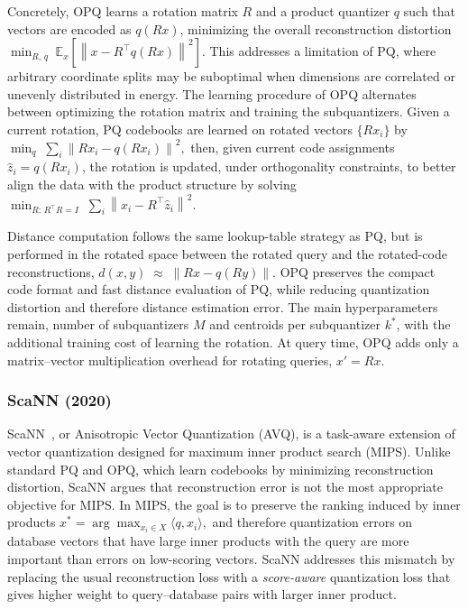 \documentclass[sigconf]{acmart}
\begin{document}
Concretely, OPQ learns a rotation matrix $R$ and a product quantizer $q$ such that vectors are encoded as $q(Rx)$, minimizing the overall reconstruction distortion
\(
\min_{R,\,q} \; \mathbb{E}_{x}\!\left[\left\| x - R^\top q(Rx) \right\|^2\right].
\)
This addresses a limitation of PQ, where arbitrary coordinate splits may be suboptimal when dimensions are correlated or unevenly distributed in energy.
The learning procedure of OPQ alternates between optimizing the rotation matrix and training the subquantizers.
Given a current rotation, PQ codebooks are learned on rotated vectors $\{Rx_i\}$ by 
\(
\min_{q} \; \sum_i \left\| Rx_i - q(Rx_i) \right\|^2 ,
\)
then, given current code assignments $\hat{z}_i = q(Rx_i)$, the rotation is updated, under orthogonality constraints, to better align the data with the product structure by solving
\(
\min_{R:\, R^\top R = I} \; \sum_i \left\| x_i - R^\top \hat{z}_i \right\|^2 .
\)

Distance computation follows the same lookup-table strategy as PQ, but is performed in the rotated space between the rotated query and the rotated-code reconstructions,
\(d(x,y) \;\approx\; \left\| R x - q(R y) \right\|\).
OPQ preserves the compact code format and fast distance evaluation of PQ, while reducing quantization distortion and therefore distance estimation error. 
The main hyperparameters remain, number of subquantizers $M$ and centroids per subquantizer $k^{*}$, with the additional training cost of learning the rotation. 
At query time, OPQ adds only a matrix--vector multiplication overhead for rotating queries,
\(x' = R x .\)


\subsubsection{\textbf{ScaNN (2020)}} 

ScaNN~\cite{scann}, or Anisotropic Vector Quantization (AVQ), is a task-aware extension of vector quantization designed for maximum inner product search (MIPS). 
Unlike standard PQ and OPQ, which learn codebooks by minimizing reconstruction distortion, ScaNN argues that reconstruction error is not the most appropriate objective for MIPS. 
In MIPS, the goal is to preserve the ranking induced by inner products
\(
x^*
=
\arg\max_{x_i \in X}
\langle q,x_i\rangle ,
\)
and therefore quantization errors on database vectors that have large inner products with the query are more important than errors on low-scoring vectors. 
ScaNN addresses this mismatch by replacing the usual reconstruction loss with a \emph{score-aware} quantization loss that gives higher weight to query--database pairs with larger inner product.
\end{document}
